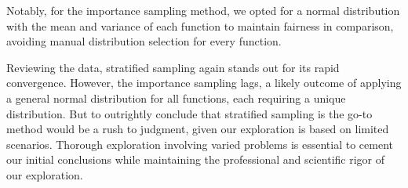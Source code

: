 \documentclass{article}
\begin{document}
Notably, for the importance sampling method, we opted for a normal distribution with the mean and variance of each function to maintain fairness in comparison, avoiding manual distribution selection for every function.

Reviewing the data, stratified sampling again stands out for its rapid convergence. However, the importance sampling lags, a likely outcome of applying a general normal distribution for all functions, each requiring a unique distribution. But to outrightly conclude that stratified sampling is the go-to method would be a rush to judgment, given our exploration is based on limited scenarios. Thorough exploration involving varied problems is essential to cement our initial conclusions while maintaining the professional and scientific rigor of our exploration.
\end{document}
